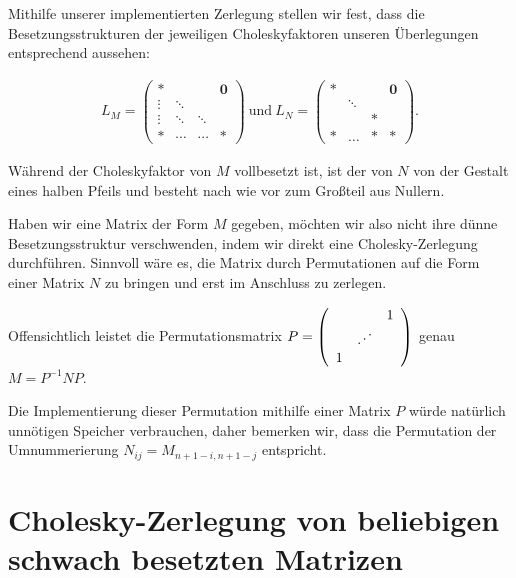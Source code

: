 \documentclass{article}
\begin{document}
Mithilfe unserer implementierten Zerlegung stellen wir fest, dass die Besetzungsstrukturen der jeweiligen Choleskyfaktoren unseren Überlegungen entsprechend aussehen:
    
\begin{align*}
    L_{M} =
\left(\begin{array}{cccccc}                                
                \ast &&&\boldsymbol{0} \\
                \vdots & \ddots && \\
                \vdots & \ddots & \ddots & \\
                \ast &\cdots &\cdots & \ast
      \end{array}
\right)   
\mathrm{~und~} 
    L_{N} =
\left(\begin{array}{cccccc}                                
                \ast &&& \boldsymbol{0} \\
                & \ddots && \\
                && \ast & \\
                \ast & \hdots & \ast & \ast 
      \end{array}
\right).
\end{align*}

Während der Choleskyfaktor von $M$ vollbesetzt ist, ist der von $N$ von der Gestalt eines halben Pfeils und besteht nach wie vor zum Großteil aus Nullern.

Haben wir eine Matrix der Form $M$ gegeben, möchten wir also nicht ihre dünne Besetzungsstruktur verschwenden, indem wir direkt eine Cholesky-Zerlegung durchführen. Sinnvoll wäre es, die Matrix durch Permutationen auf die Form einer Matrix $N$ zu bringen und erst im Anschluss zu zerlegen.

Offensichtlich leistet die Permutationsmatrix $P =
\left(\begin{array}{cccccc}                                
                &&1 \\
                & \reflectbox{$\ddots$}& \\
                1  &  & 
      \end{array}
\right) $ genau
$M=P^{-1}NP$.

Die Implementierung dieser Permutation mithilfe einer Matrix $P$ würde natürlich unnötigen Speicher verbrauchen, daher bemerken wir, dass die Permutation der Umnummerierung $N_{ij} = M_{n+1-i,n+1-j}$ entspricht.

\section{Cholesky-Zerlegung von beliebigen schwach besetzten Matrizen}
\end{document}

